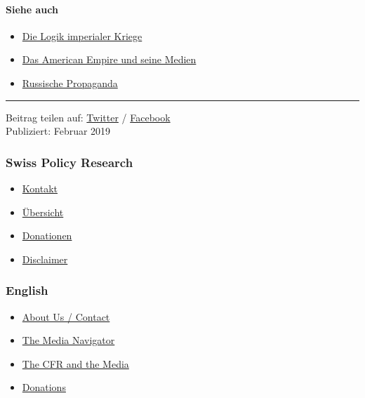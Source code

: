 \hypertarget{siehe-auch}{%
\paragraph{Siehe auch}\label{siehe-auch}}

\begin{itemize}
\tightlist
\item
  \href{https://swprs.org/logik-imperialer-kriege/}{Die Logik imperialer
  Kriege}
\item
  \href{https://swprs.org/das-american-empire-und-seine-medien/}{Das
  American Empire und seine Medien}
\item
  \href{https://swprs.org/russische-propaganda/}{Russische Propaganda}
\end{itemize}

\begin{center}\rule{0.5\linewidth}{\linethickness}\end{center}

Beitrag teilen auf:
\href{https://twitter.com/intent/tweet?url=https://swprs.org/venezuela-erdoel/}{Twitter}
/
\href{https://www.facebook.com/share.php?u=https://swprs.org/venezuela-erdoel/}{Facebook}\\
Publiziert: Februar 2019

\hypertarget{swiss-policy-research}{%
\subsubsection{Swiss Policy Research}\label{swiss-policy-research}}

\begin{itemize}
\tightlist
\item
  \href{https://swprs.org/kontakt/}{Kontakt}
\item
  \href{https://swprs.org/uebersicht/}{Übersicht}
\item
  \href{https://swprs.org/donationen/}{Donationen}
\item
  \href{https://swprs.org/disclaimer/}{Disclaimer}
\end{itemize}

\hypertarget{english}{%
\subsubsection{English}\label{english}}

\begin{itemize}
\tightlist
\item
  \href{https://swprs.org/contact/}{About Us / Contact}
\item
  \href{https://swprs.org/media-navigator/}{The Media Navigator}
\item
  \href{https://swprs.org/the-american-empire-and-its-media/}{The CFR
  and the Media}
\item
  \href{https://swprs.org/donations/}{Donations}
\end{itemize}

